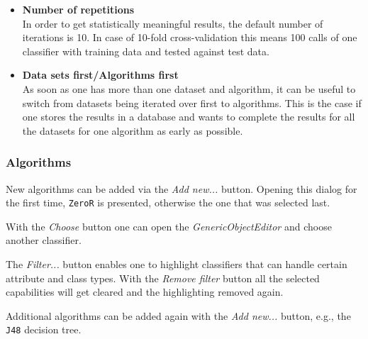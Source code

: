 \begin{itemize}
   \item \textbf{Number of repetitions} \\
      In order to get statistically meaningful results, the default number of iterations is 10. In case of 10-fold cross-validation this means 100 calls of one classifier with training data and tested against test data. 

   \item \textbf{Data sets first/Algorithms first} \\
      As soon as one has more than one dataset and algorithm, it can be useful to switch from datasets being iterated over first to algorithms. This is the case if one stores the results in a database and wants to complete the results for all the datasets for one algorithm as early as possible. 
\end{itemize}


\subsubsection{Algorithms}

New algorithms can be added via the \textit{Add new...} button. Opening this dialog for the first time, \texttt{ZeroR} is presented, otherwise the one that was selected last.

\begin{center}
\end{center}


With the \textit{Choose} button one can open the \textit{GenericObjectEditor} and choose another classifier.

\begin{center}
\end{center}

The \textit{Filter...} button enables one to highlight classifiers that can handle certain attribute and class types. With the \textit{Remove filter} button all the selected capabilities will get cleared and the highlighting removed again.

Additional algorithms can be added again with the \textit{Add new...} button, e.g., the \texttt{J48} decision tree.

\begin{center}
\end{center}


